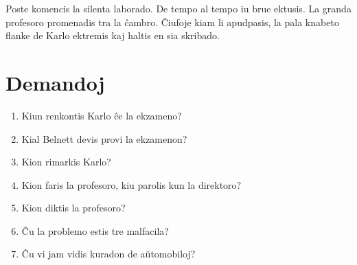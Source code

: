 Poste komencis la silenta laborado. De tempo al tempo iu brue ektusis. La granda profesoro promenadis tra la ĉambro. Ĉiufoje kiam li apudpasis, la pala knabeto flanke de Karlo ektremis kaj haltis en sia skribado.

\newpage

\section*{Demandoj}

\begin{enumerate}
    \item  Kiun renkontis Karlo ĉe la ekzameno?
    \item  Kial Belnett devis provi la ekzamenon?
    \item  Kion rimarkis Karlo?
    \item  Kion faris la profesoro, kiu parolis kun la direktoro?
    \item  Kion diktis la profesoro?
    \item  Ĉu la problemo estis tre malfacila?
    \item  Ĉu vi jam vidis kuradon de aŭtomobiloj?
\end{enumerate}
